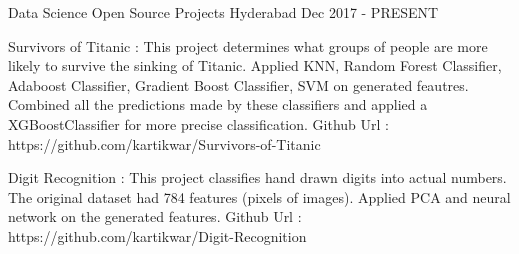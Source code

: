 \begin{cventries}


  \cventry
    {Data Science} %
    {Open Source Projects} %
    {Hyderabad} %
    {Dec 2017 - PRESENT} %
    {
      \begin{cvitems} %
        \item {Survivors of Titanic : This project determines what groups of people are more likely to survive the sinking of Titanic. Applied KNN, Random Forest Classifier, Adaboost Classifier, Gradient Boost Classifier, SVM on generated feautres. Combined all the predictions made by these classifiers and applied a XGBoostClassifier for more precise classification. Github Url : https://github.com/kartikwar/Survivors-of-Titanic}
        \item {Digit Recognition :  This project classifies hand drawn digits into actual numbers. The original dataset had 784 features (pixels of images). Applied PCA and neural network on the generated features. Github Url : https://github.com/kartikwar/Digit-Recognition}      
	\end{cvitems}
    }
\end{cventries}

